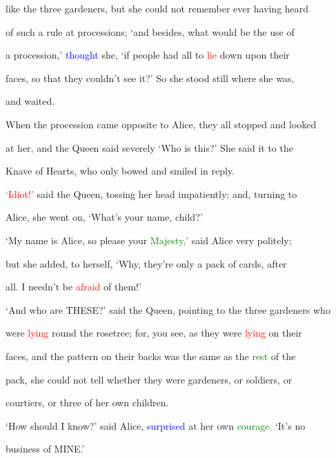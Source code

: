  like the three gardeners, but she could not remember ever having heard

 of such a \textcolor{BurntOrange}{rule} at \textcolor{BurntOrange}{processions;} ‘and besides, what would be the use of

 a \textcolor{BurntOrange}{procession,’} \textcolor{blue}{thought} she, ‘if people had all to \textcolor{red}{lie} down upon their

 faces, so that they couldn’t see it?’ So she stood still where she was,

 and \textcolor{BurntOrange}{waited.}



 When the \textcolor{BurntOrange}{procession} came opposite to Alice, they all stopped and looked

 at her, and the Queen said severely ‘Who is this?’ She said it to the

 Knave of Hearts, who only bowed and \textcolor{BurntOrange}{smiled} in reply.



 \textcolor{red}{‘Idiot!’} said the Queen, tossing her head impatiently; and, turning to

 Alice, she went on, ‘What’s your name, \textcolor{BurntOrange}{child?’}



 ‘My name is Alice, so please your \textcolor{green}{Majesty,’} said Alice very politely;

 but she added, to herself, ‘Why, they’re only a pack of cards, after

 all. I needn’t be \textcolor{red}{afraid} of them!’



 ‘And who are THESE?’ said the Queen, pointing to the three gardeners who

 were \textcolor{red}{lying} round the rosetree; for, you see, as they were \textcolor{red}{lying} on their

 faces, and the pattern on their backs was the same as the \textcolor{green}{rest} of the

 pack, she could not tell whether they were gardeners, or \textcolor{BurntOrange}{soldiers,} or

 courtiers, or three of her own \textcolor{BurntOrange}{children.}



 ‘How should I know?’ said Alice, \textcolor{blue}{surprised} at her own \textcolor{green}{courage.} ‘It’s no

 business of MINE.’



